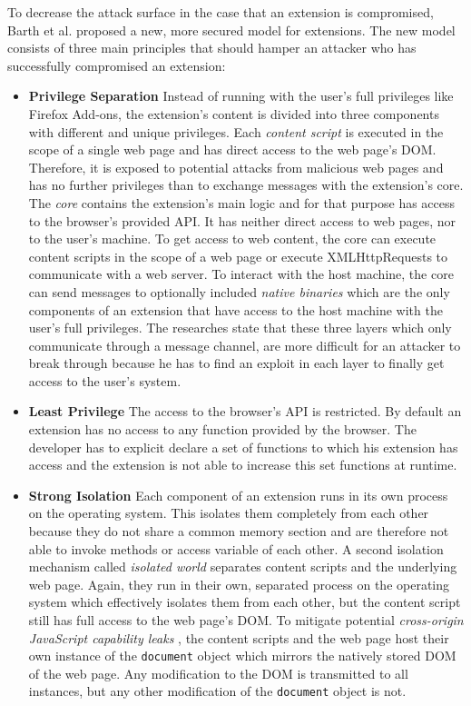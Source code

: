 	To decrease the attack surface in the case that an extension is compromised, Barth et al. proposed a new, more secured model for extensions. The new model consists of three main principles that should hamper an attacker who has successfully compromised an extension: 
	
	\begin{itemize}
		\item \textbf{Privilege Separation} Instead of running with the user's full privileges like Firefox Add-ons, the extension's content is divided into three components with different and unique privileges. Each \textit{content script} is executed in the scope of a single web page and has direct access to the web page's DOM. Therefore, it is exposed to potential attacks from malicious web pages and has no further privileges than to exchange messages with the extension's core. The \textit{core} contains the extension's main logic and for that purpose has access to the browser's provided API. It has neither direct access to web pages, nor to the user's machine. To get access to web content, the core can execute content scripts in the scope of a web page or execute XMLHttpRequests to communicate with a web server. To interact with the host machine, the core can send messages to optionally included \textit{native binaries} which are the only components of an extension that have access to the host machine with the user's full privileges. The researches state that these three layers which only communicate through a message channel, are more difficult for an attacker to break through because he has to find an exploit in each layer to finally get access to the user's system.
		
		\item \textbf{Least Privilege} The access to the browser's API is restricted. By default an extension has no access to any function provided by the browser. The developer has to explicit declare a set of functions to which his extension has access and the extension is not able to increase this set functions at runtime.
		
		\item \textbf{Strong Isolation} Each component of an extension runs in its own process on the operating system. This isolates them completely from each other because they do not share a common memory section and are therefore not able to invoke methods or access variable of each other. A second isolation mechanism called \textit{isolated world} separates content scripts and the underlying web page. Again, they run in their own, separated process on the operating system which effectively isolates them from each other, but the content script still has full access to the web page's DOM. To mitigate potential \textit{cross-origin JavaScript capability leaks} \cite{Barth:2009:CJC:1855768.1855780}, the content scripts and the web page host their own instance of the \texttt{document} object which mirrors the natively stored DOM of the web page. Any modification to the DOM is transmitted to all instances, but any other modification of the \texttt{document} object is not. 
	\end{itemize}
	

